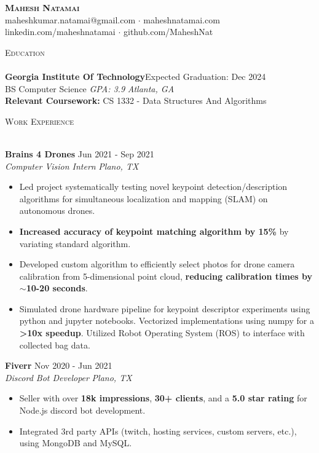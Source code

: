 \documentclass[a4paper]{article}
\newcommand{\lineunder} {
    \vspace*{-8pt} \\
    \hspace*{-18pt} \hrulefill \\
}
\newcommand{\header} [1] {
    {\hspace*{-18pt}\vspace*{6pt} \textsc{#1}}
    \vspace*{-6pt} \lineunder
}
\begin{document}
\vspace*{-40pt}

    

\vspace*{-10pt}
\begin{center}
	\textbf{\Huge \scshape {Mahesh Natamai}} \\
	maheshkumar.natamai@gmail.com $\cdot$ maheshnatamai.com \\ linkedin.com/maheshnatamai $\cdot$ github.com/MaheshNat\\
\end{center}

\header{Education}
\textbf{Georgia Institute Of Technology}\hfill  Expected Graduation: Dec 2024\\
BS Computer Science \textit{GPA: 3.9} \hfill \textit{Atlanta, GA} \\ 
\vspace{1mm} 
\textbf{Relevant Coursework:}
 CS 1332 - Data Structures And Algorithms\\
\vspace{1mm} 

\header{Work Experience}
\vspace{1mm}

\textbf{Brains 4 Drones} \hfill Jun 2021 - Sep 2021\\
\textit{Computer Vision Intern} \hfill \textit{Plano, TX} \\
\vspace{-1mm}
\begin{itemize} \itemsep -1pt
	\item Led project systematically testing novel keypoint detection/description algorithms for simultaneous localization and mapping (SLAM) on autonomous drones.
	\item \textbf{Increased accuracy of keypoint matching algorithm by 15\%} by variating standard algorithm.
        \item Developed custom algorithm to efficiently select photos for drone camera calibration from 5-dimensional point cloud, \textbf{reducing calibration times by $\sim{}$10-20 seconds}.
	\item Simulated drone hardware pipeline for keypoint descriptor experiments using python and jupyter notebooks. Vectorized implementations using numpy for a \textbf{>10x speedup}. Utilized Robot Operating System (ROS) to interface with collected bag data.
\end{itemize}
\textbf{Fiverr} \hfill Nov 2020 - Jun 2021\\
\textit{Discord Bot Developer} \hfill \textit{Plano, TX} \\
\vspace{-1mm}
\begin{itemize} \itemsep -1pt
	\item Seller with over \textbf{18k impressions}, \textbf{30+ clients}, and a \textbf{5.0 star rating} for Node.js discord bot development.
	\item Integrated 3rd party APIs (twitch, hosting services, custom servers, etc.), using MongoDB and MySQL.
\end{itemize}
\end{document}
